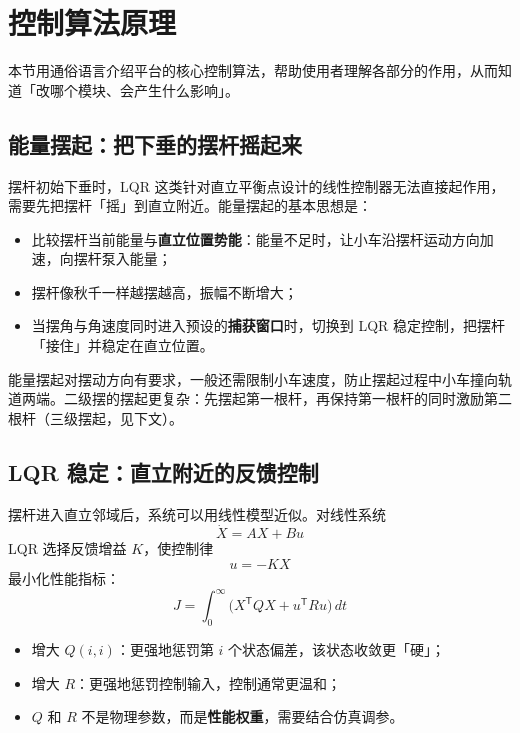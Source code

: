\documentclass[12pt,a4paper]{article}
\begin{document}
\section{控制算法原理}
\label{sec:algorithm}

本节用通俗语言介绍平台的核心控制算法，帮助使用者理解各部分的作用，从而知道「改哪个模块、会产生什么影响」。

\subsection{能量摆起：把下垂的摆杆摇起来}

摆杆初始下垂时，LQR 这类针对直立平衡点设计的线性控制器无法直接起作用，需要先把摆杆「摇」到直立附近。能量摆起的基本思想是：

\begin{itemize}
    \item 比较摆杆当前能量与\textbf{直立位置势能}：能量不足时，让小车沿摆杆运动方向加速，向摆杆泵入能量；
    \item 摆杆像秋千一样越摆越高，振幅不断增大；
    \item 当摆角与角速度同时进入预设的\textbf{捕获窗口}时，切换到 LQR 稳定控制，把摆杆「接住」并稳定在直立位置。
\end{itemize}

能量摆起对摆动方向有要求，一般还需限制小车速度，防止摆起过程中小车撞向轨道两端。二级摆的摆起更复杂：先摆起第一根杆，再保持第一根杆的同时激励第二根杆（三级摆起，见下文）。

\subsection{LQR 稳定：直立附近的反馈控制}

摆杆进入直立邻域后，系统可以用线性模型近似。对线性系统
\[
    \dot{X} = AX + Bu
\]
LQR 选择反馈增益 $K$，使控制律
\[
    u = -KX
\]
最小化性能指标：
\[
    J = \int_{0}^{\infty} \bigl( X^{\mathsf T} Q X + u^{\mathsf T} R u \bigr)\, dt
\]

\begin{itemize}
    \item 增大 $Q(i,i)$：更强地惩罚第 $i$ 个状态偏差，该状态收敛更「硬」；
    \item 增大 $R$：更强地惩罚控制输入，控制通常更温和；
    \item $Q$ 和 $R$ 不是物理参数，而是\textbf{性能权重}，需要结合仿真调参。
\end{itemize}
\end{document}

